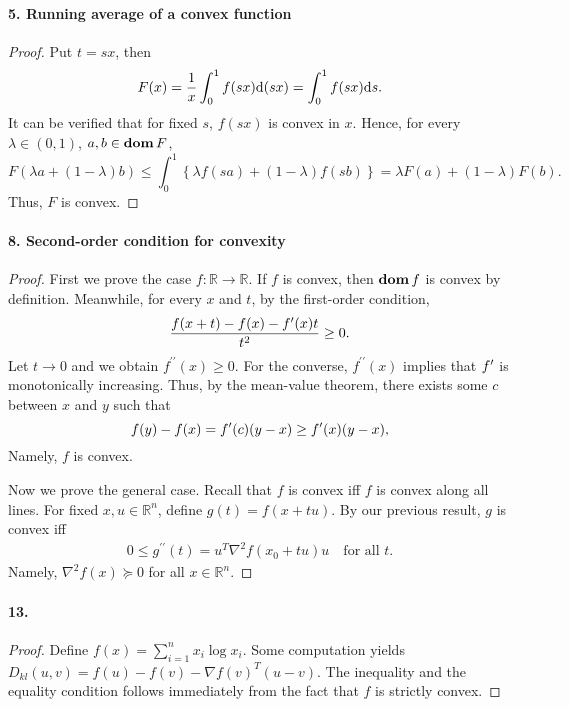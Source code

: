   \paragraph{5. Running average of a convex function}
  \begin{proof}
    Put $t=sx$, then
    \[
      F(x)=\frac{1}{x}\int_0^1f(sx)\mathrm{d}(sx)=\int_0^1f(sx)\mathrm{d} s.
    \]
    It can be verified that for fixed $s$, $f(sx)$ is convex in $x$. Hence, for
    every $\lambda\in(0,1)$, $a,b\in\operatorname{\mathbf{dom}} F$,
    \[
      F(\lambda a+(1-\lambda)b)\le
      \int_0^1\left\{\lambda f(sa)+(1-\lambda)f(sb) \right\}=
      \lambda F(a)+(1-\lambda)F(b).
    \]
    Thus, $F$ is convex.
  \end{proof}
  
  \paragraph{8. Second-order condition for convexity}
  \begin{proof}
    First we prove the case $f:\mathbb{R}\to\mathbb{R}$. If $f$ is convex, then
    $\operatorname{\mathbf{dom}} f$ is convex by definition. Meanwhile, for every $x$ and $t$, by the 
    first-order condition,
    \[
      \frac{f(x+t)-f(x)-f^\prime(x)t}{t^2}\ge 0.
    \]
    Let $t\to 0$ and we obtain $f^{\prime\prime}(x)\ge 0$. For the converse, 
    $f^{\prime\prime}(x)$ implies that $f^\prime$ is monotonically increasing. Thus,
    by the mean-value theorem, there exists some $c$ between $x$ and $y$ such 
    that
    \[
      f(y)-f(x)=f^\prime(c)(y-x) \ge f^\prime(x)(y-x),
    \]
    Namely, $f$ is convex.\par
    Now we prove the general case. Recall that $f$ is convex iff $f$ is convex
    along all lines. For fixed $x,u\in\mathbb{R}^n$, define $g(t)=f(x+tu)$. By
    our previous result, $g$ is convex iff 
    \begin{align*}
      0\le g^{\prime\prime}(t)=u^T\nabla^2f(x_0+tu)u\quad\text{for all $t$.}
    \end{align*}
    Namely, $\nabla^2f(x)\succeq 0$ for all $x\in\mathbb{R}^n$.
  \end{proof}
  

  \paragraph{13.}
  \begin{proof}
    Define $f(x)=\sum_{i=1}^n x_i\log x_i$. Some computation yields $D_{kl}(u,v)
    =f(u)-f(v)-\nabla f(v)^T(u-v)$. The inequality and the equality condition
    follows immediately from the fact that $f$ is strictly convex.
  \end{proof}

